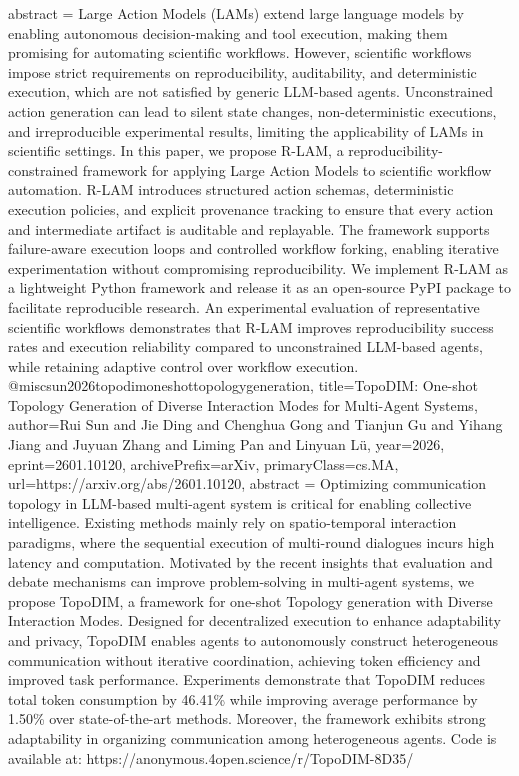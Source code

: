 {      abstract = {Large Action Models (LAMs) extend large language models by enabling autonomous decision-making and tool execution, making them promising for automating scientific workflows. However, scientific workflows impose strict requirements on reproducibility, auditability, and deterministic execution, which are not satisfied by generic LLM-based agents. Unconstrained action generation can lead to silent state changes, non-deterministic executions, and irreproducible experimental results, limiting the applicability of LAMs in scientific settings.   In this paper, we propose R-LAM, a reproducibility-constrained framework for applying Large Action Models to scientific workflow automation. R-LAM introduces structured action schemas, deterministic execution policies, and explicit provenance tracking to ensure that every action and intermediate artifact is auditable and replayable. The framework supports failure-aware execution loops and controlled workflow forking, enabling iterative experimentation without compromising reproducibility.   We implement R-LAM as a lightweight Python framework and release it as an open-source PyPI package to facilitate reproducible research. An experimental evaluation of representative scientific workflows demonstrates that R-LAM improves reproducibility success rates and execution reliability compared to unconstrained LLM-based agents, while retaining adaptive control over workflow execution.}
}@misc{sun2026topodimoneshottopologygeneration,
      title={TopoDIM: One-shot Topology Generation of Diverse Interaction Modes for Multi-Agent Systems}, 
      author={Rui Sun and Jie Ding and Chenghua Gong and Tianjun Gu and Yihang Jiang and Juyuan Zhang and Liming Pan and Linyuan Lü},
      year={2026},
      eprint={2601.10120},
      archivePrefix={arXiv},
      primaryClass={cs.MA},
      url={https://arxiv.org/abs/2601.10120},
      abstract = {Optimizing communication topology in LLM-based multi-agent system is critical for enabling collective intelligence. Existing methods mainly rely on spatio-temporal interaction paradigms, where the sequential execution of multi-round dialogues incurs high latency and computation. Motivated by the recent insights that evaluation and debate mechanisms can improve problem-solving in multi-agent systems, we propose TopoDIM, a framework for one-shot Topology generation with Diverse Interaction Modes. Designed for decentralized execution to enhance adaptability and privacy, TopoDIM enables agents to autonomously construct heterogeneous communication without iterative coordination, achieving token efficiency and improved task performance. Experiments demonstrate that TopoDIM reduces total token consumption by 46.41\% while improving average performance by 1.50\% over state-of-the-art methods. Moreover, the framework exhibits strong adaptability in organizing communication among heterogeneous agents. Code is available at: https://anonymous.4open.science/r/TopoDIM-8D35/}
}

